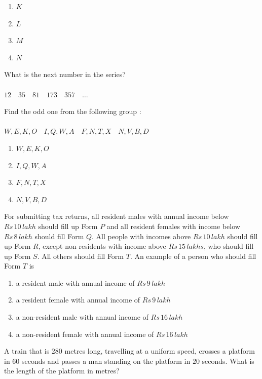     \begin{table}[H]    
  \centering
  
  \label{tab1.1.9.2}
\end{table}
    \begin{enumerate}
        \item $K$
        \item $L$
        \item $M$
        \item $N$
    \end{enumerate}
    \item What is the next number in the series?\\ \\
        $12\quad 35\quad81\quad173\quad357\quad\dots$
    \item Find the odd one from the following group $\colon$ \\ \\
        $W,E,K,O\quad I,Q,W,A\quad F,N,T,X\quad N,V,B,D$
     \begin{enumerate}
        \item $W,E,K,O$
        \item $I,Q,W,A$
        \item $F,N,T,X$
        \item $N,V,B,D$
    \end{enumerate}
    \item For submitting tax returns, all resident males with annual income below $Rs\,10\,lakh$ should fill up Form $P$ and all resident females with income below $Rs\,8\,lakh$ should fill Form $Q$. All people with incomes above $Rs\,10\,lakh$ should fill up Form $R$, except non-residents with income above $Rs\,15\,lakhs$, who should fill up Form $S$. All others should fill Form $T$. An example of a person who should fill Form $T$ is 
        \begin{enumerate}
            \item a resident male with annual income of $Rs\,9\,lakh$
            \item a resident female with annual income of $Rs\,9\,lakh$
            \item a non-resident male with annual income of $Rs\,16\,lakh$
            \item a non-resident female with annual income of $Rs\,16\,lakh$
        \end{enumerate}
    \item A train that is $280$ metres long, travelling at a uniform speed, crosses a platform in $60$ seconds and passes a man standing on the platform in $20$ seconds. What is the length of the platform in metres?
